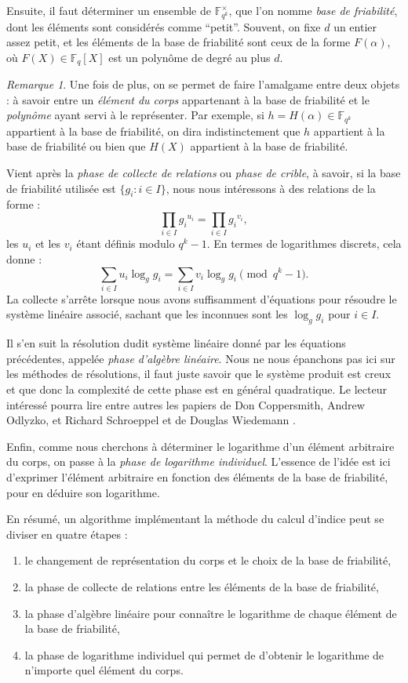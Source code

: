 \documentclass[a4paper, titlepage, 11pt]{article}
\theoremstyle{definition}
\theoremstyle{remark}
\newtheorem{rema}[theo]{Remarque}
\def\gf #1{\mathbb{F}_{#1}}
\begin{document}
Ensuite, il faut déterminer un ensemble de $\gf{q^k}^\times$, que l'on nomme \textit{base de friabilité}, dont les éléments sont considérés comme ``petit''. Souvent, on fixe $d$ un entier assez petit, et les éléments de la base de friabilité sont ceux de la forme $F(\alpha)$, où $F(X)\in\gf{q}[X]$ est un polynôme de degré au plus $d$.

\begin{rema}
Une fois de plus, on se permet de faire l'amalgame entre deux objets : à savoir entre un \textit{élément du corps} appartenant à la base de friabilité et le \textit{polynôme} ayant servi à le représenter. Par exemple, si $h = H(\alpha)\in\gf{q^k}$ appartient à la base de friabilité, on dira indistinctement que $h$  appartient à la base de friabilité ou bien que $H(X)$ appartient à la base de friabilité.
\end{rema}

Vient après la \textit{phase de collecte de relations} ou \textit{phase de crible}, à savoir, si la base de friabilité utilisée est $\{g_i : i \in I\}$, nous nous intéressons à des relations de la forme :
$$\prod_{i\in I} {g_i}^{u_i} = \prod_{i\in I} {g_i}^{v_i},$$
les $u_i$ et les $v_i$ étant définis modulo $q^k-1$. En termes de logarithmes discrets, cela donne :
$$\sum_{i\in I} u_i \log_gg_i = \sum_{i\in I} v_i \log_gg_i \pmod{q^k-1}.$$
La collecte s’arrête lorsque nous avons suffisamment d'équations pour résoudre le système linéaire associé, sachant que les inconnues sont les $\log_gg_i$ pour  $i\in I$.

Il s'en suit la résolution dudit système linéaire donné par les équations précédentes, appelée \textit{phase d'algèbre linéaire}. Nous ne nous épanchons pas ici sur les méthodes de résolutions, il faut juste savoir que le système produit est creux et que donc la complexité de cette phase est en général quadratique. Le lecteur intéressé pourra lire entre autres les papiers de Don Coppersmith, Andrew Odlyzko, et Richard Schroeppel \cite{coppersmith1986} et de Douglas Wiedemann \cite{wiedemann1986}.

Enfin, comme nous cherchons à déterminer le logarithme d'un élément arbitraire du corps, on passe à la \textit{phase de logarithme individuel}. L'essence de l'idée est ici d'exprimer l'élément arbitraire en fonction des éléments de la base de friabilité, pour en déduire son logarithme.

En résumé, un algorithme implémentant la méthode du calcul d'indice peut se diviser en quatre étapes : \begin{enumerate}
\item le changement de représentation du corps et le choix de la base de friabilité,
\item la phase de collecte de relations entre les éléments de la base de friabilité,
\item la phase d'algèbre linéaire pour connaître le logarithme de chaque élément de la base de friabilité,
\item la phase de logarithme individuel qui permet de d'obtenir le logarithme de n’importe quel élément du corps.
\end{enumerate}
\end{document}

